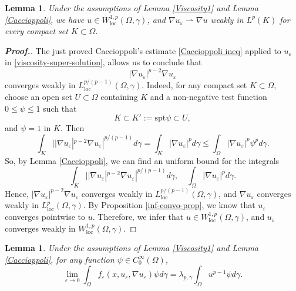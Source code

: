 \documentclass[12pt]{amsart}
\newtheorem{lemma}[theorem]{Lemma}
\newcommand{\1}{\mathbf 1}
\begin{document}
\begin{lemma}\label{weak-converges}
Under the assumptions of Lemma \ref{Viscosity1}{    and Lemma \ref{Caccioppoli}}, we have $u\in W^{1,p}_{\mathrm{loc}}(\Omega,\gamma)$, and $\nabla u_\varepsilon \rightharpoonup \nabla u$ weakly in $L^{p}(K)$ for every compact set  $K \subset\Omega$.
\end{lemma}

\begin{proof}[\bf Proof.]
The just proved Caccioppoli's estimate \eqref{Caccioppoli ineq} applied to $u_\varepsilon$ in \eqref{viscosity-super-solution}, allows us to conclude that
\[
|\nabla u_\varepsilon|^{p-2}\nabla u_\varepsilon
\]
converges weakly in $L^{p/(p-1)}_{\mathrm{loc}}(\Omega,\gamma)$. Indeed, for any compact set $K\subset \Omega$, choose
an open set $U\subset \Omega$ containing $K$ and
a non-negative test function $0\leq \psi \leq 1$ such that
\[
K\subset K':=\mathrm{spt} \psi \subset U,
\]
and $\psi=1$ in $K$. Then
\[
\int_K ||\nabla u_\varepsilon|^{p-2}\nabla u_\varepsilon |^{p/(p-1)} d\gamma= \int_K |\nabla u_\varepsilon|^{p}d\gamma \leq \int_\Omega |\nabla u_\varepsilon|^p \psi^p d\gamma.
\]
So, by Lemma \ref{Caccioppoli}, we can find an uniform bound for the integrals
\[
\int_K ||\nabla u_\varepsilon|^{p-2}\nabla u_\varepsilon |^{p/(p-1)} d\gamma,\quad \int_\Omega |\nabla u_\varepsilon|^p d\gamma.
\]
Hence, $|\nabla u_\varepsilon|^{p-2}\nabla u_\varepsilon$ converges weakly in $L_{\mathrm{loc}}^{p/(p-1)}(\Omega,\gamma)$, and $\nabla u_\varepsilon $ converges weakly in $L_{\mathrm{loc}}^p(\Omega,\gamma )$. By Proposition \ref{inf-convo-prop}, we know that $u_\varepsilon$ converges pointwise to $u$. Therefore, we infer that $u\in W^{1,p}_{\mathrm{loc}}(\Omega,\gamma)$, and $u_\varepsilon$ converges weakly in $W^{1,p}_{\mathrm{loc}}(\Omega,\gamma)$.
\end{proof}

\begin{lemma}\label{error-term}
Under the assumptions of Lemma \ref{Viscosity1} {    and Lemma \ref{Caccioppoli}}, for any function $\psi \in C^{\infty}_0(\Omega)$,
\begin{equation}\nonumber
\mathop{\lim}_{\varepsilon \rightarrow 0} \int_{\Omega} f_\varepsilon(x,u_\varepsilon,\nabla u_\varepsilon) \psi d\gamma=\lambda_{p,\gamma}\int_\Omega u^{p-1}  \psi d\gamma.
\end{equation}
\end{lemma}
\end{document}
